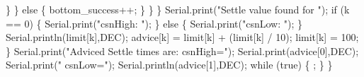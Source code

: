 \begin{DoxyCodeInclude}
          \}
        \} \textcolor{keywordflow}{else} \{
          bottom\_success++;
        \}
      \}
    \}
    Serial.print(\textcolor{stringliteral}{"Settle value found for "});
    \textcolor{keywordflow}{if} (k == 0) \{
      Serial.print(\textcolor{stringliteral}{"csnHigh: "});
    \} \textcolor{keywordflow}{else} \{
      Serial.print(\textcolor{stringliteral}{"csnLow: "});
    \}
    Serial.println(limit[k],DEC);
    advice[k] = limit[k] + (limit[k] / 10);
    limit[k] = 100;
  \}
  Serial.print(\textcolor{stringliteral}{"Adviced Settle times are: csnHigh="});
  Serial.print(advice[0],DEC);
  Serial.print(\textcolor{stringliteral}{" csnLow="}); 
  Serial.println(advice[1],DEC);
  \textcolor{keywordflow}{while} (\textcolor{keyword}{true})
  \{
    ;
  \}
\}

\end{DoxyCodeInclude}
 